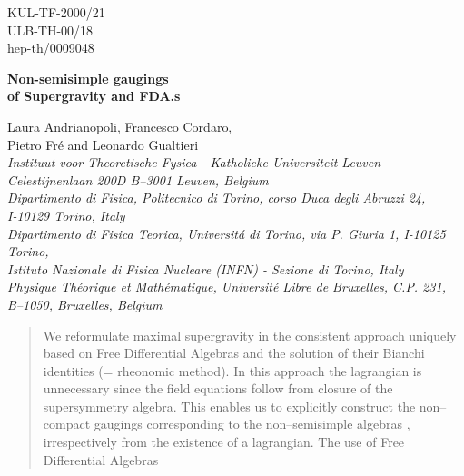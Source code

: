 \documentclass[a4paper,12pt]{article}
\begin{document}
\begin{titlepage}
\begin{flushright}
KUL-TF-2000/21\\
ULB-TH-00/18\\
hep-th/0009048 \\
\end{flushright}
\vskip 2cm
\begin{center}
{\Large \bf
Non-semisimple gaugings \\ of \coordHE{} Supergravity
and FDA.s\myHighlight{$^\dagger$}\coordHE{}\\
}
\vfill

{\large  Laura Andrianopoli\coordHE{}, Francesco Cordaro\coordHE{},}\\
{\large Pietro Fr\'e\coordHE{} and Leonardo Gualtieri\coordHE{}} \\
\vfill
{ \sl
{}\coordHE{}  Instituut voor Theoretische Fysica - Katholieke Universiteit Leuven
\\Celestijnenlaan 200D B--3001 Leuven, Belgium\\
\coordHE{} Dipartimento di Fisica, Politecnico di Torino, corso Duca
degli Abruzzi 24, \\
I-10129 Torino, Italy\\
 \coordHE{} Dipartimento di Fisica Teorica, Universit\'a di Torino,
via P. Giuria 1,
I-10125 Torino, \\
 Istituto Nazionale di Fisica Nucleare (INFN) - Sezione di Torino,
Italy \\
\coordHE{} Physique Th\'eorique et Math\'ematique, Universit\'e Libre de
Bruxelles, C.P. 231, B--1050, Bruxelles, Belgium }
\end{center}
\vfill
\begin{abstract}
{We reformulate maximal \coordHE{} supergravity in the consistent approach uniquely
based on Free Differential Algebras and the solution of their
Bianchi identities (= rheonomic method).
In this approach the lagrangian is unnecessary since the field equations
follow from closure of the supersymmetry algebra.
This enables us to explicitly construct the non--compact gaugings
corresponding to the non--semisimple algebras \coordHE{},
irrespectively from the existence of a lagrangian.
The use of Free Differential Algebras
}
\end{abstract}
\end{titlepage}
\end{document}
